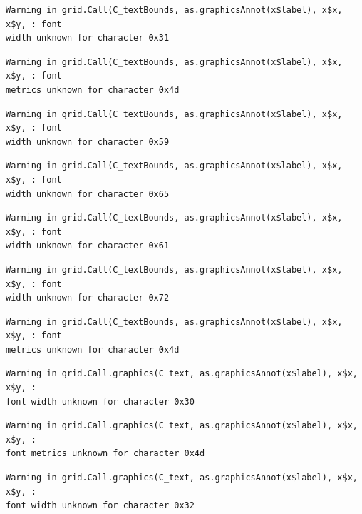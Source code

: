 \documentclass[
  letterpaper,
]{scrbook}
\begin{document}
\begin{verbatim}
Warning in grid.Call(C_textBounds, as.graphicsAnnot(x$label), x$x, x$y, : font
width unknown for character 0x31
\end{verbatim}

\begin{verbatim}
Warning in grid.Call(C_textBounds, as.graphicsAnnot(x$label), x$x, x$y, : font
metrics unknown for character 0x4d
\end{verbatim}

\begin{verbatim}
Warning in grid.Call(C_textBounds, as.graphicsAnnot(x$label), x$x, x$y, : font
width unknown for character 0x59
\end{verbatim}

\begin{verbatim}
Warning in grid.Call(C_textBounds, as.graphicsAnnot(x$label), x$x, x$y, : font
width unknown for character 0x65
\end{verbatim}

\begin{verbatim}
Warning in grid.Call(C_textBounds, as.graphicsAnnot(x$label), x$x, x$y, : font
width unknown for character 0x61
\end{verbatim}

\begin{verbatim}
Warning in grid.Call(C_textBounds, as.graphicsAnnot(x$label), x$x, x$y, : font
width unknown for character 0x72
\end{verbatim}

\begin{verbatim}
Warning in grid.Call(C_textBounds, as.graphicsAnnot(x$label), x$x, x$y, : font
metrics unknown for character 0x4d
\end{verbatim}

\begin{verbatim}
Warning in grid.Call.graphics(C_text, as.graphicsAnnot(x$label), x$x, x$y, :
font width unknown for character 0x30
\end{verbatim}

\begin{verbatim}
Warning in grid.Call.graphics(C_text, as.graphicsAnnot(x$label), x$x, x$y, :
font metrics unknown for character 0x4d
\end{verbatim}

\begin{verbatim}
Warning in grid.Call.graphics(C_text, as.graphicsAnnot(x$label), x$x, x$y, :
font width unknown for character 0x32
\end{verbatim}
\end{document}
